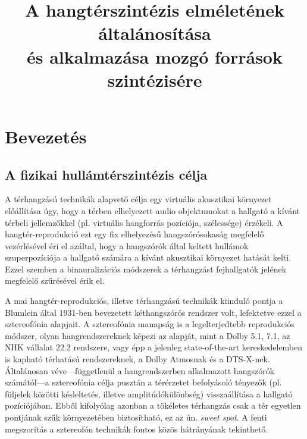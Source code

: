 \documentclass[10pt,twoside]{article}
\author{\theauthor}
\title{A hangtérszintézis elméletének általánosítása\\[.5ex] \large  és alkalmazása mozgó források szintézisére}
\theoremstyle{thesisgroupstyle}
\theoremstyle{indented}
\begin{document}
\sloppy
\newcommand{\schoolname}{Budapesti Műszaki és Gazdaságtudományi Egyetem}
\newcommand{\facultyname}{Villamosmérnöki és Informatikai Kar}
\newcommand{\doctoralname}{Villamosmérnöki Tudományok Doktori Iskola}
\newcommand{\bookname}{PhD tézisfüzet}
\newcommand{\authorname}{Author}
\newcommand{\supervisorname}{Konzulens:}
\newcommand{\supervisor}{Dr. Fiala Péter}
\newcommand{\creationdate}{Budapest, 2018.}
\def \deptlogo {logos/hit_logo_en.png}
\def \lablogo {logos/last_logo_eng.png}

\nonfrenchspacing


\thispagestyle{empty}
\cleardoublepage
\setcounter{page}{1}

\section{Bevezetés}

\subsection{A fizikai hullámtérszintézis célja}
%
A térhangzású technikák alapvető célja egy virtuális akusztikai környezet előállítása úgy, hogy a térben elhelyezett audio objektumokat a hallgató a kívánt térbeli jellemzőkkel (pl. virtuális hangforrás pozíciója, szélessége) érzékeli.
A hangtér-reprodukció ezt egy fix elhelyezésű hangszórósokaság megfelelő vezérlésével éri el azáltal, hogy a hangszórók által keltett hullámok szuperpozíciója a hallgató számára a kívánt akusztikai környezet hatását kelti.
Ezzel szemben a binauralizációs módszerek a térhangzást fejhallgatók jelének megfelelő szűrésével érik el.

A mai hangtér-reprodukciós, illetve térhangzású technikák kiinduló pontja a Blumlein által 1931-ben bevezetett kéthangszórós rendszer volt, lefektetve ezzel	 a sztereofónia alapjait.
A sztereofónia manapság is a legelterjedtebb reprodukciós módszer, olyan hangrendszereknek képezi az alapját, mint a Dolby 5.1, 7.1, az NHK vállalat 22.2 rendszere, vagy épp a jelenleg state-of-the-art kereskedelemben is kapható térhatású rendszereknek, a Dolby Atmosnak és a DTS-X-nek.
Általánosan véve---függetlenül a hangrendszerben alkalmazott hangszórók számától---a sztereofónia célja pusztán a térérzetet befolyásoló tényezők (pl. füljelek közötti késleltetés, illetve amplitúdókülönbség) visszaállítása a hallgató pozíciójában.
Ebből kifolyólag azonban a tökéletes térhangzás csak a tér egyetlen pontjának szűk környezetében biztosítható, ez az ún. \emph{sweet spot}.
A fenti megszorítás a sztereofón technikák fontos közös hátrányának tekinthető.
\end{document}
